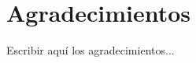 \chapter*{\hfill{\centering Agradecimientos}\hfill}
\vspace{0.5cm}
\justify
\normalsize


Escribir aquí los agradecimientos...

\newpage